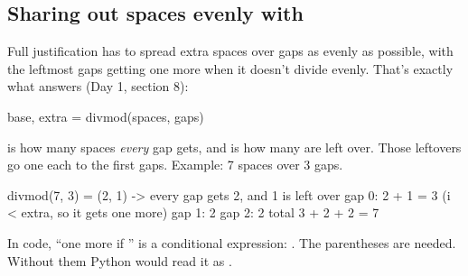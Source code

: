 \documentclass[10pt,a4paper]{article}
\begin{document}
\subsection{Sharing out spaces evenly with }
Full justification has to spread  extra spaces over  gaps as evenly as possible, with the leftmost gaps getting one more when it doesn’t divide evenly. That’s exactly what  answers (Day 1, section 8):
\begin{pycode}
base, extra = divmod(spaces, gaps)
\end{pycode}
 is how many spaces \emph{every} gap gets, and  is how many are left over. Those leftovers go one each to the first  gaps. Example: 7 spaces over 3 gaps.
\begin{txtcode}
divmod(7, 3) = (2, 1)  ->  every gap gets 2, and 1 is left over
gap 0: 2 + 1 = 3       (i < extra, so it gets one more)
gap 1: 2
gap 2: 2               total 3 + 2 + 2 = 7
\end{txtcode}
In code, “one more if ” is a conditional expression: . The parentheses are needed. Without them Python would read it as .
\end{document}
